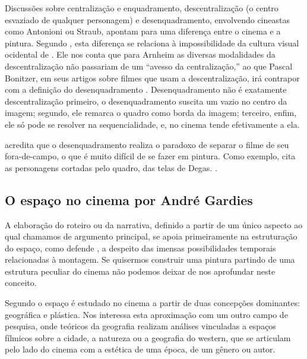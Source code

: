 Discussões sobre centralização e enquadramento, descentralização (o
centro esvaziado de qualquer personagem) e desenquadramento, envolvendo
cineastas como Antonioni ou Straub, apontam para uma diferença entre o
cinema e a pintura. Segundo \textcite{aumont2004olho}, esta diferença
se relaciona à impossibilidade da cultura visual ocidental de
. Ele nos conta que para Arnheim as
diversas modalidades da descentralização não passariam de um
\enquote{avesso da centralização,} ao que Pascal Bonitzer, em seus
artigos sobre filmes que usam a descentralização, irá contrapor com a
definição do desenquadramento \parencite[2019]{aumont2004olho}. Desenquadramento não é exatamente
descentralização \textelp{} primeiro, o desenquadramento suscita um
vazio no centro da imagem; segundo, ele remarca o quadro como borda da
imagem; terceiro, enfim, ele só pode se resolver na sequencialidade, e,
no cinema tende efetivamente a ela.
\parencite[Bonitzer \emph{in}][129]{aumont2004olho}

\citeauthor{aumont2004olho} acredita que o desenquadramento realiza o paradoxo de separar o filme de seu
fora-de-campo, o que é muito difícil de se fazer em pintura. Como
exemplo, cita as personagens cortadas pelo quadro, das telas de Degas.
.

\subsection{O espaço no cinema por André Gardies}%
\label{sec-espaco-cinema-gardies}

A elaboração do roteiro ou da narrativa, definido a partir de um único
aspecto ao qual chamamos de argumento principal, se apoia primeiramente
na estruturação do espaço, como defende \textcite{gardies2019espaco}, a
despeito das imensas possibilidades temporais relacionadas à montagem.
Se quisermos construir uma pintura partindo de uma estrutura peculiar
do cinema não podemos deixar de nos aprofundar neste conceito.

Segundo \textcite{gardies2019espaco} o espaço é estudado no cinema a
partir de duas concepções dominantes: geográfica e plástica. Nos
interessa esta aproximação com um outro campo de pesquisa, onde
teóricos da geografia realizam análises vinculadas a espaços fílmicos
sobre a cidade, a natureza ou a geografia do western, que se articulam
pelo lado do cinema com a estética de uma época, de um gênero ou autor.

